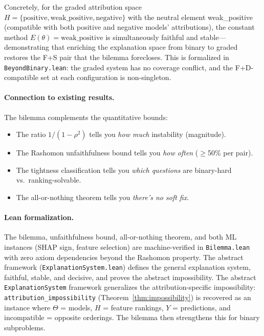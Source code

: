 \documentclass{article}
\begin{document}
Concretely, for the graded attribution space $H = \{\text{positive}, \text{weak\_positive}, \text{negative}\}$ with the neutral element weak\_positive (compatible with both positive and negative models' attributions), the constant method $E(\theta) = \text{weak\_positive}$ is simultaneously faithful and stable---demonstrating that enriching the explanation space from binary to graded restores the F+S pair that the bilemma forecloses. This is formalized in \texttt{BeyondBinary.lean}: the graded system has no coverage conflict, and the F+D-compatible set at each configuration is non-singleton.

\paragraph{Connection to existing results.}
The bilemma complements the quantitative bounds:
\begin{itemize}
\item The ratio $1/(1{-}\rho^2)$ tells you \textit{how much} instability (magnitude).
\item The Rashomon unfaithfulness bound tells you \textit{how often} ($\geq$50\% per pair).
\item The tightness classification tells you \textit{which questions} are binary-hard vs.\ ranking-solvable.
\item The all-or-nothing theorem tells you \textit{there's no soft fix}.
\end{itemize}

\paragraph{Lean formalization.}
The bilemma, unfaithfulness bound, all-or-nothing theorem, and both ML instances (SHAP sign, feature selection) are machine-verified in \texttt{Bilemma.lean} with zero axiom dependencies beyond the Rashomon property.
The abstract framework (\texttt{ExplanationSystem.lean}) defines the general explanation system, faithful, stable, and decisive, and proves the abstract impossibility.
The abstract \texttt{ExplanationSystem} framework generalizes the attribution-specific impossibility: \texttt{attribution\_impossibility} (Theorem~\ref{thm:impossibility}) is recovered as an instance where $\Theta$ = models, $H$ = feature rankings, $Y$ = predictions, and $\text{incompatible}$ = opposite orderings. The bilemma then strengthens this for binary subproblems.

\end{document}
